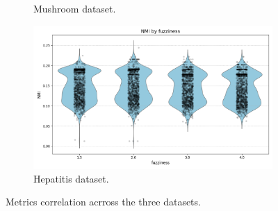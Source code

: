 \begin{figure}[H]
\begin{subfigure}{0.32\textwidth}
		\caption{Mushroom dataset.}
	\end{subfigure}
	\begin{subfigure}{0.32\textwidth}
		\centering
		\includegraphics[width=\linewidth]{figures/FuzzyCMeans/hepatitis_violin_fuzziness_vs_NMI}
		\caption{Hepatitis dataset.}
	\end{subfigure}
	\caption{Metrics correlation acrross the three datasets.}
	\label{fig:metrics_corr_fuzzy}
\end{figure}



